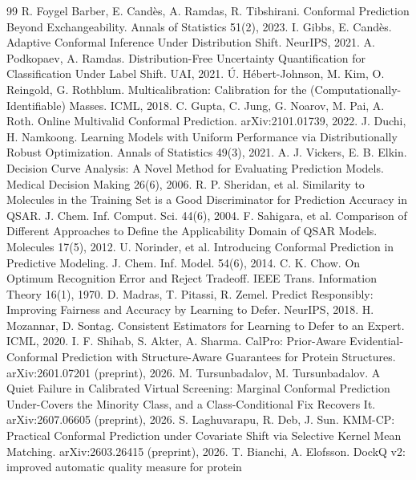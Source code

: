 \documentclass[10pt]{article}
\begin{document}
\begin{thebibliography}{99}
 R. Foygel Barber, E. Cand\`es, A. Ramdas, R. Tibshirani. Conformal Prediction
Beyond Exchangeability. Annals of Statistics 51(2), 2023.
 I. Gibbs, E. Cand\`es. Adaptive Conformal Inference Under Distribution Shift.
NeurIPS, 2021.
 A. Podkopaev, A. Ramdas. Distribution-Free Uncertainty Quantification for
Classification Under Label Shift. UAI, 2021.
 \'U. H\'ebert-Johnson, M. Kim, O. Reingold, G. Rothblum. Multicalibration:
Calibration for the (Computationally-Identifiable) Masses. ICML, 2018.
 C. Gupta, C. Jung, G. Noarov, M. Pai, A. Roth. Online Multivalid Conformal
Prediction. arXiv:2101.01739, 2022.
 J. Duchi, H. Namkoong. Learning Models with Uniform Performance via
Distributionally Robust Optimization. Annals of Statistics 49(3), 2021.
 A. J. Vickers, E. B. Elkin. Decision Curve Analysis: A Novel Method for Evaluating
Prediction Models. Medical Decision Making 26(6), 2006.
 R. P. Sheridan, et al. Similarity to Molecules in the Training Set is a Good Discriminator
for Prediction Accuracy in QSAR. J. Chem. Inf. Comput. Sci. 44(6), 2004.
 F. Sahigara, et al. Comparison of Different Approaches to Define the Applicability
Domain of QSAR Models. Molecules 17(5), 2012.
 U. Norinder, et al. Introducing Conformal Prediction in Predictive Modeling.
J. Chem. Inf. Model. 54(6), 2014.
 C. K. Chow. On Optimum Recognition Error and Reject Tradeoff. IEEE Trans. Information
Theory 16(1), 1970.
 D. Madras, T. Pitassi, R. Zemel. Predict Responsibly: Improving Fairness and Accuracy
by Learning to Defer. NeurIPS, 2018.
 H. Mozannar, D. Sontag. Consistent Estimators for Learning to Defer to an Expert.
ICML, 2020.
 I. F. Shihab, S. Akter, A. Sharma. CalPro: Prior-Aware Evidential-Conformal Prediction
with Structure-Aware Guarantees for Protein Structures. arXiv:2601.07201 (preprint), 2026.
 M. Tursunbadalov, M. Tursunbadalov. A Quiet Failure in Calibrated Virtual Screening:
Marginal Conformal Prediction Under-Covers the Minority Class, and a Class-Conditional Fix Recovers It.
arXiv:2607.06605 (preprint), 2026.
 S. Laghuvarapu, R. Deb, J. Sun. KMM-CP: Practical Conformal Prediction under Covariate
Shift via Selective Kernel Mean Matching. arXiv:2603.26415 (preprint), 2026.
 T. Bianchi, A. Elofsson. DockQ v2: improved automatic quality measure for protein

\end{thebibliography}
\end{document}
